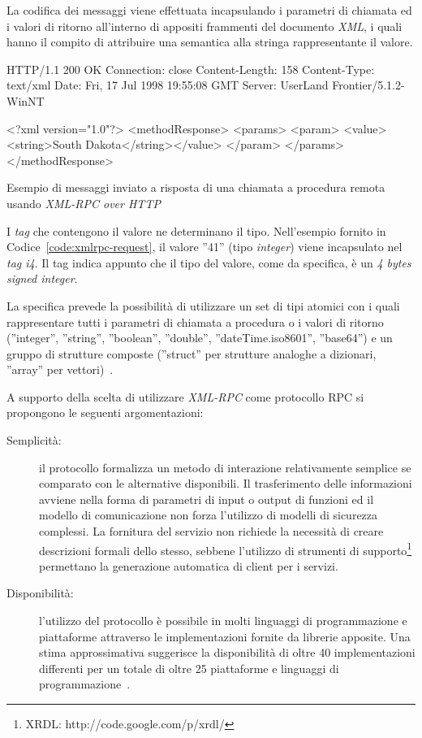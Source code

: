 La codifica dei messaggi viene effettuata incapsulando i parametri di chiamata ed i valori di ritorno all'interno di appositi frammenti del documento \emph{XML}, i quali hanno il compito di attribuire una semantica alla stringa rappresentante il valore.

\begin{program}
\begin{verbatimtab}
HTTP/1.1 200 OK
Connection: close
Content-Length: 158
Content-Type: text/xml
Date: Fri, 17 Jul 1998 19:55:08 GMT
Server: UserLand Frontier/5.1.2-WinNT


<?xml version="1.0"?>
<methodResponse>
   <params>
      <param>
         <value><string>South Dakota</string></value>
         </param>
      </params>
   </methodResponse>
\end{verbatimtab}
\caption{Esempio di messaggi inviato a risposta di una chiamata a procedura remota usando \emph{XML-RPC over HTTP}}\label{code:xmlrpc-response}
\end{program}

I \emph{tag} che contengono il valore ne determinano il tipo. Nell'esempio fornito in Codice~\ref{code:xmlrpc-request}, il valore ''41'' (tipo \emph{integer}) viene incapsulato nel \emph{tag i4}. Il tag indica appunto che il tipo del valore, come da specifica, è un \emph{4 bytes signed integer}.

La specifica prevede la possibilità di utilizzare un set di tipi atomici con i quali rappresentare tutti i parametri di chiamata a procedura o i valori di ritorno (''integer'', ''string'', ''boolean'', ''double'', ''dateTime.iso8601'', ''base64'') e un gruppo di strutture composte (''struct'' per strutture analoghe a dizionari, ''array'' per vettori)~\cite{xmlrpcspec}.

A supporto della scelta di utilizzare \emph{XML-RPC} come protocollo RPC si propongono le seguenti argomentazioni:
\begin{description}
	\item[Semplicità:] il protocollo formalizza un metodo di interazione relativamente semplice se comparato con le alternative disponibili. Il trasferimento delle informazioni avviene nella forma di parametri di input o output di funzioni ed il modello di comunicazione non forza l'utilizzo di modelli di sicurezza complessi. La fornitura del servizio non richiede la necessità di creare descrizioni formali dello stesso, sebbene l'utilizzo di strumenti di supporto\footnote{XRDL: http://code.google.com/p/xrdl/} permettano la generazione automatica di client per i servizi.
	\item[Disponibilità:] l'utilizzo del protocollo è possibile in molti linguaggi di programmazione e piattaforme attraverso le implementazioni fornite da librerie apposite. Una stima approssimativa suggerisce la disponibilità di oltre 40 implementazioni differenti per un totale di oltre 25 piattaforme e linguaggi di programmazione~\cite{wikipedia-xmlrpc}.
\end{description}


